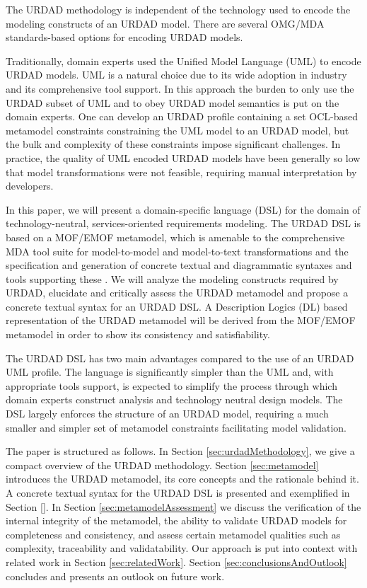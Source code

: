 The URDAD methodology is independent of the technology used to encode the modeling constructs of an URDAD model. There are several OMG/MDA standards-based options for encoding URDAD models.

Traditionally, domain experts used the Unified Model Language (UML) to encode URDAD models. UML is a natural choice due to its wide adoption in industry and its comprehensive tool support. In this approach the burden to only use the URDAD subset of UML and to obey URDAD model semantics is put on the domain experts. One can develop an URDAD profile containing a set OCL-based metamodel constraints constraining the UML model to an URDAD model, but the bulk and complexity of these constraints impose significant challenges. In practice, the quality of UML encoded URDAD models have been generally so low that model transformations were not feasible, requiring manual interpretation by developers.

In this paper, we will present a domain-specific language (DSL) for the domain of technology-neutral, services-oriented requirements modeling. The URDAD DSL is based on a MOF/EMOF metamodel, which is amenable to the comprehensive MDA tool suite for model-to-model and model-to-text transformations and the specification and generation of concrete textual and diagrammatic syntaxes and tools supporting these \cite{gronback_model_2008}. We will analyze the modeling constructs required by URDAD, elucidate and critically assess the URDAD metamodel and propose a concrete textual syntax for an URDAD DSL. A Description Logics (DL) based representation of the URDAD metamodel will be derived from the MOF/EMOF metamodel in order to show its consistency and satisfiability.

The URDAD DSL has two main advantages compared to the use of an URDAD UML profile. The language is significantly simpler than the UML and, with appropriate tools support, is expected to simplify the process through which domain experts construct analysis and technology neutral design models. The DSL largely enforces the structure of an URDAD model, requiring a much smaller and simpler set of metamodel constraints facilitating model validation.

The paper is structured as follows. In Section \ref{sec:urdadMethodology}, we give a compact overview of the URDAD methodology. Section \ref{sec:metamodel} introduces the URDAD metamodel, its core concepts and the rationale behind it. A concrete textual syntax for the URDAD DSL is presented and exemplified in Section \ref{}. In Section \ref{sec:metamodelAssessment} we discuss the verification of the internal integrity of the metamodel, the ability to validate URDAD models for completeness and consistency, and assess certain metamodel qualities such as complexity, traceability and validatability. Our approach is put into context with related work in Section \ref{sec:relatedWork}. Section \ref{sec:conclusionsAndOutlook} concludes and presents an outlook on future work.
